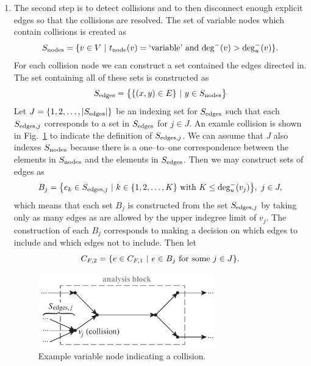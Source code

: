 \begin{enumerate}
\item The second step is to detect collisions and to then disconnect enough explicit edges so that the collisions are resolved. The set of variable nodes which contain collisions is created as
\begin{equation}
S_\textrm{nodes} = \{v \in V \ | \  t_\textrm{node}(v) = \textrm{`variable'} \textrm{ and } \textrm{deg}^-(v) > \textrm{deg}_u^-(v) \}.
\end{equation}
For each collision node we can construct a set contained the edges directed in. The set containing all of these sets is constructed as
\begin{equation}
S_\textrm{edges} = \big \{ \{(x,y) \in E\} \ | \  y \in S_\textrm{nodes} \big \}
\end{equation}
Let $J=\{1,2,\ldots,|S_\textrm{edges}|\}$ be an indexing set for $S_\textrm{edges}$ such that each $S_{\textrm{edges},j}$ corresponds to a set in $S_\textrm{edges}$ for $j \in J$. An examle collision is shown in Fig.~\ref{f:collision} to indicate the definition of $S_{\textrm{edges},j}$. We can assume that $J$ also indexes $S_\textrm{nodes}$ because there is a one--to--one correspondence between the elements in $S_\textrm{nodes}$ and the elements in $S_\textrm{edges}$. Then we may construct sets of edges as
\begin{equation}
B_j = \big \{e_k \in S_{\textrm{edges},j} \ | \  k \in \{1,2,\ldots,K\} \textrm{ with } K \leq \textrm{deg}_u^-(v_j) \big \}, \ j \in J,
\end{equation}
which means that each set $B_j$ is constructed from the set $S_{\textrm{edges},j}$ by taking only as many edges as are allowed by the upper indegree limit of $v_j$. The construction of each $B_j$ corresponds to making a decision on which edges to include and which edges not to include. Then let
\begin{equation}
C_{F,2} = \{ e \in C_{F,1} \ | \  e \in B_j \textrm{ for some } j \in J\}.
\end{equation}
\begin{figure}[htb!]
	\begin{center}
	\includegraphics[width=3in]{images/analysis_block_collision}
	\end{center}
	\vspace{-20pt}
\caption{Example variable node indicating a collision.}
\label{f:collision}
\end{figure}


\end{enumerate}
